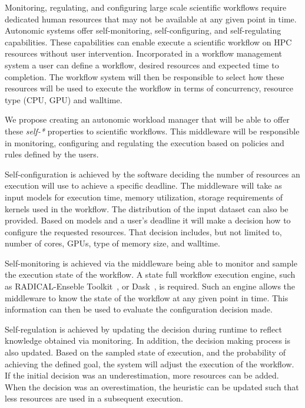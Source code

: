 


Monitoring, regulating, and configuring large scale scientific workflows 
require dedicated human resources that may not be available at any given point 
in time. Autonomic systems offer self-monitoring, self-configuring, and 
self-regulating capabilities. These capabilities can enable execute a 
scientific workflow on HPC resources without user intervention. Incorporated in 
a workflow management system a user can define a workflow, desired resources 
and expected time to completion. The workflow system will then be responsible 
to select how these resources will be used to execute the workflow in terms of 
concurrency, resource type (CPU, GPU) and walltime.

We propose creating an autonomic workload manager that will be able to offer 
these \textit{self-*} properties to scientific workflows. This middleware will 
be responsible in monitoring, configuring and regulating the execution based on 
policies and rules defined by the users.

Self-configuration is achieved by the software deciding the number of resources 
an execution will use to achieve a specific deadline. The middleware will take 
as input models for execution time, memory utilization, storage requirements of 
kernels used in the workflow. The distribution of the input dataset can also be 
provided. Based on models and a user's deadline it will make a decision how to 
configure the requested resources. That decision includes, but not limited to, 
number of cores, GPUs, type of memory size, and walltime.

Self-monitoring is achieved via the middleware being able to monitor and sample 
the execution state of the workflow. A state full workflow execution engine,
such as RADICAL-Enseble Toolkit~\cite{balasubramanian2018harnessing}, or 
Dask~\cite{rocklin2015dask}, is required. Such an engine allows the middleware 
to know the state of the workflow at any given point in time. This information 
can then be used to evaluate the configuration decision made.

Self-regulation is achieved by updating the decision during runtime to reflect 
knowledge obtained via monitoring. In addition, the decision making process is 
also updated. Based on the sampled state of execution, and the probability of 
achieving the defined goal, the system will adjust the execution of the 
workflow. If the initial decision was an underestimation, more resources can be 
added. When the decision was an overestimation, the heuristic can be updated 
such that less resources are used in a subsequent execution.

